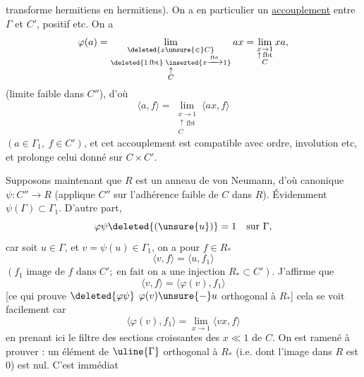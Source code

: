 transforme hermitiens en hermitiens). On a en particulier un \uline{accouplement} entre \(\Gamma\) et \(C'\), positif etc. On a
\[
\varphi(a)=\lim_{\substack{\deleted{x\unsure{\in} C}\\\deleted{1\,\mathrm{fbt}}\;\inserted{x\xrightarrow{\mathrm{fbt}}1}\\\uparrow\\C}}ax
=\lim_{\substack{x\to1\\\uparrow\,\mathrm{fbt}\\C}}xa,
\]
(limite faible dans \(C''\)), d'où 
\[
\langle a,f\rangle=\lim_{\substack{x\to1\\\uparrow\,\mathrm{fbt}\\C}}\langle ax,f\rangle
\]
\((a\in\Gamma_1,\ f\in C')\), et cet accouplement est compatible avec ordre, involution etc, et prolonge celui donné sur \(C\times C'\).

Supposons maintenant que \(R\) est un anneau de von Neumann, d'où canonique \(\psi:C''\to R\) (applique \(C''\) sur l'adhérence faible de \(C\) dans \(R\)). Évidemment \(\psi(\Gamma)\subset\Gamma_1\). D'autre part,
\[
\varphi\psi\deleted{(\unsure{u})}=1\quad\text{sur }\Gamma,
\]
car soit \(u\in\Gamma\),  et \(v=\psi(u)\in\Gamma_1\), on a pour  \(f\in R_*\)
\[
\langle v,f\rangle=\langle u,f_1\rangle
\]
\((f_1\text{ image de }f\text{ dans }C';\;\text{en fait on a une injection }R_*\subset C')\).
J'affirme que
\[
\langle v,f\rangle=\langle\varphi(v),f_1\rangle
\]
[ce qui prouve \(\deleted{\varphi\psi}\) \(\varphi(v)\unsure{-}u\) orthogonal à \(R_*\)] cela se voit facilement car
\[
\langle\varphi(v),f_1\rangle=\lim_{x\to1}\langle vx,f\rangle
\]
en prenant ici le filtre des sections croissantes des  \(x\ll1\) de \(C\). On est ramené à prouver : un élément de \(\uline{\Gamma}\) orthogonal à \(R_*\)  (i.e. dont l'image dans \(R\) est \(0\)) est nul. C'est immédiat

